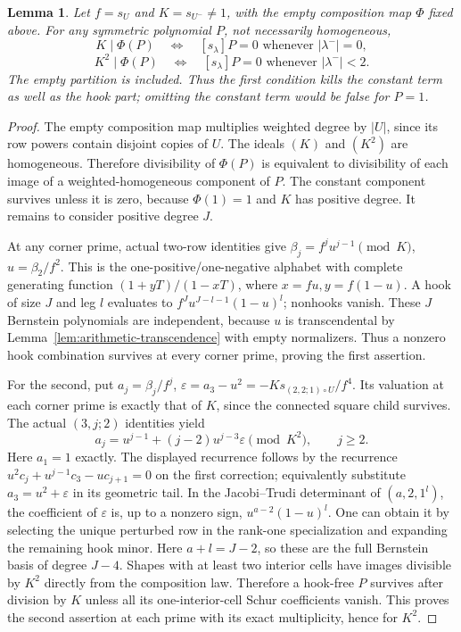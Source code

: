\documentclass[11pt,a4paper]{amsart}
\numberwithin{equation}{section}
\theoremstyle{plain}
\newtheorem{lemma}[theorem]{Lemma}
\theoremstyle{definition}
\begin{document}
\begin{lemma}\label{lem:two-layers}
Let \(f=s_U\) and \(K=s_{U^-}\ne1\), with the empty composition map \(\Phi\) fixed above.  For any symmetric polynomial \(P\), not necessarily homogeneous,
\[
 K\mid\Phi(P)\quad\Longleftrightarrow\quad
 [s_\lambda]P=0\text{ whenever }|\lambda^-|=0,
\]
\[
 K^2\mid\Phi(P)\quad\Longleftrightarrow\quad
 [s_\lambda]P=0\text{ whenever }|\lambda^-|<2.
\]
The empty partition is included.  Thus the first condition kills the constant term as well as the hook part; omitting the constant term would be false for \(P=1\).
\end{lemma}
\begin{proof}
The empty composition map multiplies weighted degree by \(|U|\), since its row powers contain disjoint copies of \(U\).  The ideals \((K)\) and \((K^2)\) are homogeneous.  Therefore divisibility of \(\Phi(P)\) is equivalent to divisibility of each image of a weighted-homogeneous component of \(P\).  The constant component survives unless it is zero, because \(\Phi(1)=1\) and \(K\) has positive degree.  It remains to consider positive degree \(J\).

At any corner prime, actual two-row identities give
\(\beta_j=f^ju^{j-1}\pmod K\), \(u=\beta_2/f^2\).  This is the one-positive/one-negative alphabet with complete generating function \((1+yT)/(1-xT)\), where \(x=fu,y=f(1-u)\).  A hook of size \(J\) and leg \(l\) evaluates to \(f^Ju^{J-l-1}(1-u)^l\); nonhooks vanish.  These \(J\) Bernstein polynomials are independent, because \(u\) is transcendental by Lemma~\ref{lem:arithmetic-transcendence} with empty normalizers.  Thus a nonzero hook combination survives at every corner prime, proving the first assertion.

For the second, put \(a_j=\beta_j/f^j\), \(\varepsilon=a_3-u^2=-K s_{(2,2;1)\circ U}/f^4\).  Its valuation at each corner prime is exactly that of \(K\), since the connected square child survives.  The actual \((3,j;2)\) identities yield
\[
 a_j=u^{j-1}+(j-2)u^{j-3}\varepsilon\pmod {K^2},\qquad j\ge2.
\]
Here \(a_1=1\) exactly.  The displayed recurrence follows by the recurrence \(u^2c_j+u^{j-1}c_3-u c_{j+1}=0\) on the first correction; equivalently substitute \(a_3=u^2+\varepsilon\) in its geometric tail.  In the Jacobi--Trudi determinant of \((a,2,1^l)\), the coefficient of \(\varepsilon\) is, up to a nonzero sign, \(u^{a-2}(1-u)^l\).  One can obtain it by selecting the unique perturbed row in the rank-one specialization and expanding the remaining hook minor.  Here \(a+l=J-2\), so these are the full Bernstein basis of degree \(J-4\).  Shapes with at least two interior cells have images divisible by \(K^2\) directly from the composition law.  Therefore a hook-free \(P\) survives after division by \(K\) unless all its one-interior-cell Schur coefficients vanish.  This proves the second assertion at each prime with its exact multiplicity, hence for \(K^2\).
\end{proof}
\end{document}

